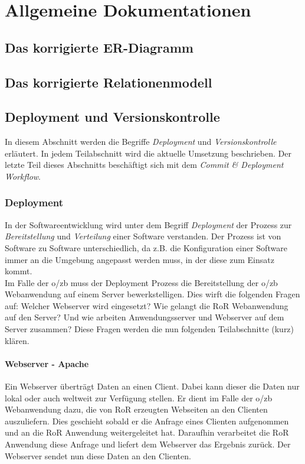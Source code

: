 \documentclass[12pt,             %
               a4paper,          %
               listof=totoc,     %
               index=totoc,      %
               bibliography=totoc,%
               oneside,         %
               BCOR1cm,          %
               english   %
               ]{scrbook}
\begin{document}
\clearpage
\chapter{Allgemeine Dokumentationen}
\section{Das korrigierte ER-Diagramm}

\section{Das korrigierte Relationenmodell}

\section{Deployment und Versionskontrolle}
In diesem Abschnitt werden die Begriffe \textit{Deployment} und \textit{Versionskontrolle} erläutert. In jedem Teilabschnitt wird die aktuelle Umsetzung beschrieben. Der letzte Teil dieses Abschnitts beschäftigt sich mit dem \textit{Commit \& Deployment Workflow}.

\subsection{Deployment}
In der Softwareentwicklung wird unter dem Begriff \textit{Deployment} der Prozess zur \textit{Bereitstellung} und \textit{Verteilung} einer Software verstanden. Der Prozess ist von Software zu Software unterschiedlich, da z.B. die Konfiguration einer Software immer an die Umgebung angepasst werden muss, in der diese zum Einsatz kommt.\\

Im Falle der o/zb muss der Deployment Prozess die Bereitstellung der o/zb Webanwendung auf einem Server bewerkstelligen. Dies wirft die folgenden Fragen auf: Welcher Webserver wird eingesetzt? Wie gelangt die RoR Webanwendung auf den Server? Und wie arbeiten Anwendungsserver und Webserver auf dem Server zusammen? Diese Fragen werden die nun folgenden Teilabschnitte (kurz) klären.

\subsubsection{Webserver - Apache}
Ein Webserver überträgt Daten an einen Client. Dabei kann dieser die Daten nur lokal oder auch weltweit zur Verfügung stellen. Er dient im Falle der o/zb Webanwendung dazu, die von RoR erzeugten Webseiten an den Clienten auszuliefern. Dies geschieht sobald er die Anfrage eines Clienten aufgenommen und an die RoR Anwendung weitergeleitet hat. Daraufhin verarbeitet die RoR Anwendung diese Anfrage und liefert dem Webserver das Ergebnis zurück. Der Webserver sendet nun diese Daten an den Clienten.\\
\end{document}
